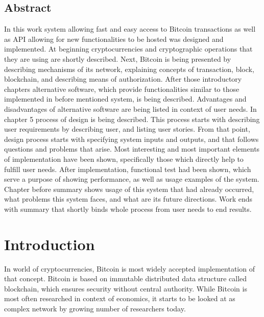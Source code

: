 \documentclass[12pt, en, eng, oneside]{mgr}
\begin{document}
\section*{Abstract}

In this work system allowing fast and easy access to Bitcoin transactions as well as API allowing for new functionalities to be hosted was designed and implemented. At beginning cryptocurrencies and cryptographic operations that they are using are shortly described. Next, Bitcoin is being presented by describing mechanisms of its network, explaining concepts of transaction, block, blockchain, and describing means of authorization. After those introductory chapters alternative software, which provide functionalities similar to those implemented in before mentioned system, is being described. Advantages and disadvantages of alternative software are being listed in context of user needs. In chapter 5 process of design is being described. This process starts with describing user requirements by describing user, and listing user stories. From that point, design process starts with specifying system inputs and outputs, and that follows questions and problems that arise. Most interesting and most important elements of implementation have been shown, specifically those which directly help to fulfill user needs. After implementation, functional test had been shown, which serve a purpose of showing performance, as well as usage examples of the system. Chapter before summary shows usage of this system that had already occurred, what problems this system faces, and what are its future directions. Work ends with summary that shortly binds whole process from user needs to end results.

\chapter{Introduction}

In world of cryptocurrencies, Bitcoin is most widely accepted implementation of that concept. Bitcoin is based on immutable distributed data structure called blockchain, which ensures security without central authority. While Bitcoin is most often researched in context of economics, it starts to be looked at as complex network by growing number of researchers today. 
\end{document}
